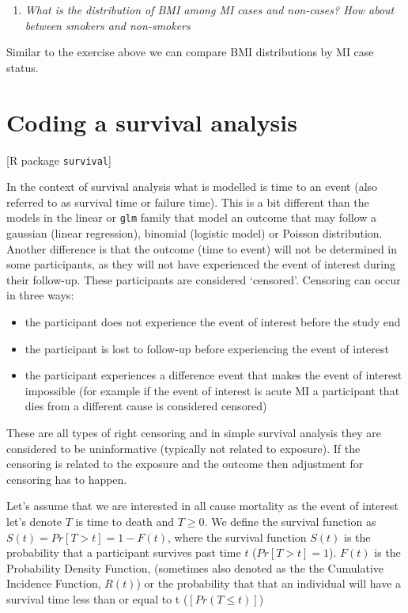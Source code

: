 \documentclass[
]{book}
\providecommand{\tightlist}{%
  \setlength{\itemsep}{0pt}\setlength{\parskip}{0pt}}
\begin{document}
\begin{enumerate}
\def\labelenumi{\arabic{enumi}.}
\setcounter{enumi}{4}
\tightlist
\item
  \emph{What is the distribution of BMI among MI cases and non-cases? How about between smokers and non-smokers}
\end{enumerate}

Similar to the exercise above we can compare BMI distributions by MI case status.

\hypertarget{coding-a-survival-analysis}{%
\section{Coding a survival analysis}\label{coding-a-survival-analysis}}

{[}R package \texttt{survival}{]}

In the context of survival analysis what is modelled is time to an event (also referred to as survival time or failure time). This is a bit different than the models in the linear or \texttt{glm} family that model an outcome that may follow a gaussian (linear regression), binomial (logistic model) or Poisson distribution. Another difference is that the outcome (time to event) will not be determined in some participants, as they will not have experienced the event of interest during their follow-up. These participants are considered `censored'. Censoring can occur in three ways:

\begin{itemize}
\tightlist
\item
  the participant does not experience the event of interest before the study end
\item
  the participant is lost to follow-up before experiencing the event of interest
\item
  the participant experiences a difference event that makes the event of interest impossible (for example if the event of interest is acute MI a participant that dies from a different cause is considered censored)
\end{itemize}

These are all types of right censoring and in simple survival analysis they are considered to be uninformative (typically not related to exposure). If the censoring is related to the exposure and the outcome then adjustment for censoring has to happen.

Let's assume that we are interested in all cause mortality as the event of interest let's denote \(T\) is time to death and \(T\geq 0\). We define the survival function as
\(S(t)=Pr[T>t]=1-F(t)\), where the survival function \(S(t)\) is the probability that a participant survives past time \(t\) (\(Pr[T>t]=1\)). \(F(t)\) is the Probability Density Function, (sometimes also denoted as the the Cumulative Incidence Function, \(R(t)\)) or the probability that that an individual will have a survival time less than or equal to t (\([Pr(T≤t)]\))
\end{document}
